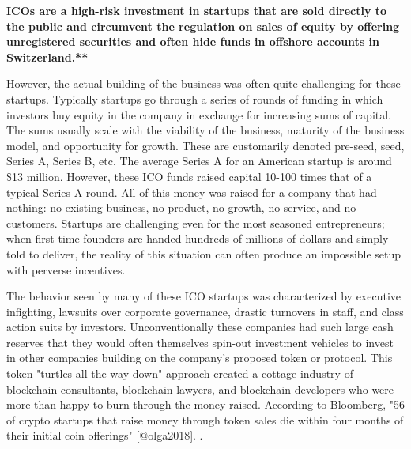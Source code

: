
\begin{infobox}
 \textbf{
    ICOs are a high-risk investment in startups that are sold directly to the
    public and circumvent the regulation on sales of equity by offering
    unregistered securities and often hide funds in offshore accounts in
    Switzerland.**
  }
\end{infobox}

However, the actual building of the business was often quite challenging for
these startups. Typically startups go through a series of rounds of funding in
which investors buy equity in the company in exchange for increasing sums of
capital. The sums usually scale with the viability of the business, maturity of
the business model, and opportunity for growth. These are customarily denoted
pre-seed, seed, Series A, Series B, etc. The average Series A for an American
startup is around \$13 million. However, these ICO funds raised capital 10-100
times that of a typical Series A round. All of this money was raised for a
company that had nothing: no existing business, no product, no growth, no
service, and no customers. Startups are challenging even for the most seasoned
entrepreneurs; when first-time founders are handed hundreds of millions of
dollars and simply told to deliver, the reality of this situation can often
produce an impossible setup with perverse incentives. \cite{howell2018initial}

The behavior seen by many of these ICO startups was characterized by executive
infighting, lawsuits over corporate governance, drastic turnovers in staff, and
class action suits by investors. Unconventionally these companies had such large
cash reserves that they would often themselves spin-out investment vehicles to
invest in other companies building on the company's proposed token or protocol.
This token "turtles all the way down" approach created a cottage industry of
blockchain consultants, blockchain lawyers, and blockchain developers who were
more than happy to burn through the money raised. According to Bloomberg, "56%
of crypto startups that raise money through token sales die within four months
of their initial coin offerings" [@olga2018].
\cite{olga2018}.


